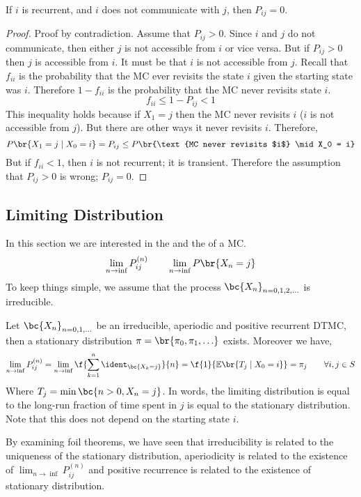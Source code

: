 \documentclass{article}
\newcommand{\Exp}{\mathbb{E}}
\begin{document}
\begin{theorem}
    If $i$ is recurrent, and $i$ does not communicate with $j$, then $P_{ij} = 0$.
\end{theorem}
\begin{proof}
    Proof by contradiction. Assume that $P_{ij} > 0$. Since $i$ and $j$ do not communicate, then either $j$ is not accessible from $i$ or vice versa. But if $P_{ij}>0$ then $j$ is accessible from $i$. It must be that $i$ is not accessible from $j$. Recall that $f_{ii}$ is the probability that the MC ever revisits the state $i$ given the starting state was $i$. Therefore $1 - f_{ii}$ is the probability that the MC never revisits state $i$.
    \[ f_{ii} \leq 1 - P_{ij} < 1 \]
    This inequality holds because if $X_1 = j$ then the MC never revisits $i$ ($i$ is not accessible from $j$). But there are other ways it never revisits $i$. Therefore,
    \[ P\br{X_1 = j \mid X_0 = i} = P_{ij} \leq P\br{\text{MC never revisits $i$} \mid X_0 = i} \]
    But if $f_{ii} < 1$, then $i$ is not recurrent; it is transient. Therefore the assumption that $P_{ij} > 0$ is wrong; $P_{ij} = 0$.
\end{proof}

\subsection{Limiting Distribution}

In this section we are interested in the  and the  of a MC.
\[ \lim_{n \to \inf} P^{(n)}_{ij} \qquad \lim_{n \to \inf} P\br{X_n = j} \]
To keep things simple, we assume that the process $\bc{X_n}_{n=0,1,2,\dots}$ is irreducible.

\begin{theorem}
     Let $\bc{X_n}_{n=0,1,\ldots}$ be an irreducible, aperiodic and positive recurrent DTMC, then a stationary distribution $\pi = \br{\pi_0, \pi_1, \ldots}$ exists. Moreover we have,
    \[ \lim_{n \to \inf} P^{(n)}_{ij} = \lim_{n \to \inf} \f{\sum_{k=1}^{n} \ident_{\bc{X_k = j}}}{n} = \f{1}{\Exp\br{T_j \mid X_0 = i}} = \pi_j \qquad \forall i,j \in S \]
    Where $T_j = \min\bc{n > 0, X_n = j}$. In words, the limiting distribution is equal to the long-run fraction of time spent in $j$ is equal to the stationary distribution. Note that this does not depend on the starting state $i$.
\end{theorem}

By examining foil theorems, we have seen that irreducibility is related to the uniqueness of the stationary distribution, aperiodicity is related to the existence of $\lim_{n \to \inf} P^{(n)}_{ij}$ and positive recurrence is related to the existence of stationary distribution. \\
\end{document}
